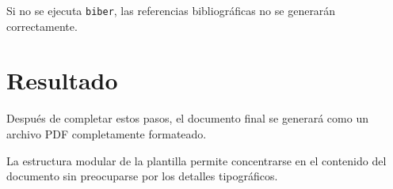 


\begin{warningbox}
Si no se ejecuta \texttt{biber}, las referencias
bibliográficas no se generarán correctamente.
\end{warningbox}




\section{Resultado}

Después de completar estos pasos, el documento
final se generará como un archivo PDF completamente
formateado.



\begin{examplebox}
La estructura modular de la plantilla permite
concentrarse en el contenido del documento sin
preocuparse por los detalles tipográficos.
\end{examplebox}
